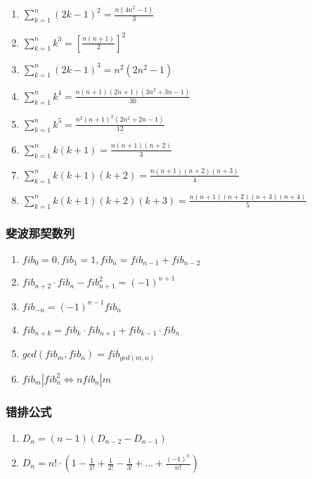\documentclass[landscape,twocolumn,a4paper]{article}
\begin{document}
	\begin{enumerate}
		\item $\sum_{k=1}^{n}(2k-1)^2 = \frac{n(4n^2-1)}{3}	$
		\item $\sum_{k=1}^{n}k^3 = [\frac{n(n+1)}{2}]^2	$
		\item $\sum_{k=1}^{n}(2k-1)^3 = n^2(2n^2-1)	$
		\item $\sum_{k=1}^{n}k^4 = \frac{n(n+1)(2n+1)(3n^2+3n-1)}{30}  $
		\item $\sum_{k=1}^{n}k^5 = \frac{n^2(n+1)^2(2n^2+2n-1)}{12}	$
		\item $\sum_{k=1}^{n}k(k+1) = \frac{n(n+1)(n+2)}{3}	$
		\item $\sum_{k=1}^{n}k(k+1)(k+2) = \frac{n(n+1)(n+2)(n+3)}{4} $
		\item $\sum_{k=1}^{n}k(k+1)(k+2)(k+3) = \frac{n(n+1)(n+2)(n+3)(n+4)}{5} $
	\end{enumerate}

	\subsubsection*{斐波那契数列}

	\begin{enumerate}
		\item $fib_0=0, fib_1=1, fib_n=fib_{n-1}+fib_{n-2}$
		\item $fib_{n+2} \cdot fib_n-fib_{n+1}^2=(-1)^{n+1}$
		\item $fib_{-n}=(-1)^{n-1}fib_n$
		\item $fib_{n+k}=fib_k \cdot fib_{n+1}+fib_{k-1} \cdot fib_n$
		\item $gcd(fib_m, fib_n)=fib_{gcd(m, n)}$
		\item $fib_m|fib_n^2\Leftrightarrow nfib_n|m$
	\end{enumerate}

	\subsubsection*{错排公式}

	\begin{enumerate}
		\item $D_n = (n-1)(D_{n-2}-D_{n-1})$
		\item $D_n = n! \cdot (1-\frac{1}{1!}+\frac{1}{2!}-\frac{1}{3!}+\ldots+\frac{(-1)^n}{n!})$
	\end{enumerate}
\end{document}
